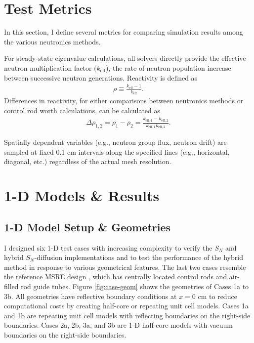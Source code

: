 \section{Test Metrics} \label{sec:test-metrics}

In this section, I define several metrics for comparing simulation results among the various
neutronics methods.

For steady-state eigenvalue calculations, all solvers directly provide the effective neutron
multiplication factor ($k_\text{eff}$), the rate of neutron population increase between successive
neutron generations. Reactivity is defined as
%
\begin{gather}
  \rho \equiv \frac{k_\text{eff}-1}{k_\text{eff}}.
\end{gather}
%
Differences in reactivity, for either comparisons between neutronics methods or control rod worth
calculations, can be calculated as
%
\begin{gather}
  \Delta\rho_{1,2} = \rho_1 - \rho_2 =
  \frac{k_{\text{eff},1}-k_{\text{eff},2}}{k_{\text{eff},1}k_{\text{eff},2}}.
\end{gather}

Spatially dependent variables (e.g., neutron group flux, neutron drift) are sampled at fixed 0.1 cm
intervals along the specified lines (e.g., horizontal, diagonal, etc.) regardless of the actual
mesh resolution.

\section{1-D Models \& Results} \label{sec:1d-results}

\subsection{1-D Model Setup \& Geometries}

I designed six 1-D test cases with increasing complexity to verify the $S_N$ and hybrid
$S_N$-diffusion implementations and to test the performance of the hybrid
method in response to various geometrical features. The last two cases resemble the
reference \gls{MSRE} design \cite{robertson_msre_1965}, which has centrally located control rods
and air-filled rod guide tubes. Figure \ref{fig:case-geom} shows the geometries of Cases 1a to
3b. All geometries have reflective boundary conditions at $x=0$ cm to reduce computational costs by
creating half-core or repeating unit cell models. Cases 1a and 1b are repeating unit
cell models with reflecting boundaries on the right-side boundaries. Cases 2a, 2b, 3a, and 3b
are 1-D half-core models with vacuum boundaries on the right-side boundaries.

